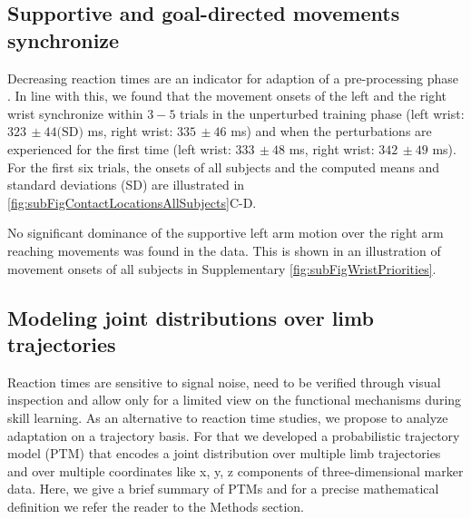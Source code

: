 

\subsection*{Supportive and goal-directed movements synchronize}

Decreasing reaction times are an indicator for adaption of a pre-processing 
phase \cite{klatzky1995planning}. In line with this, we found that the movement onsets of the left 
and the right wrist synchronize within $3-5$ trials in the unperturbed training 
phase (left wrist: $323 \, \pm 44 \textrm{(SD)}$ ms, right wrist: $335 \, \pm 46$ ms) and when the 
perturbations are experienced for the first time (left wrist: $333 \, \pm 48$ ms, right wrist: $342 \, \pm 49$ ms). 
For the first six trials, the onsets of all subjects and the computed means and standard deviations (SD) are illustrated in \FigureAbbr \ref{fig:subFigContactLocationsAllSubjects}C-D. 

No significant dominance of the supportive left arm motion 
over the right arm reaching movements was found in the data. 
This is shown in an illustration of movement onsets of all subjects in Supplementary \FigureAbbr \ref{fig:subFigWristPriorities}. 



\subsection*{Modeling joint distributions over limb trajectories}
Reaction times are sensitive to signal noise, need to be verified through visual inspection and 
allow only for a limited view on the functional mechanisms during skill learning. 
As an alternative to reaction time studies, we propose to analyze adaptation on 
a trajectory basis. 
%
For that we developed a probabilistic trajectory model (PTM) that encodes a 
joint distribution over multiple limb trajectories and over multiple coordinates 
like x, y, z components of three-dimensional marker data. Here, we give a brief 
summary of PTMs and for a precise mathematical definition we refer the reader to 
the Methods section. 

